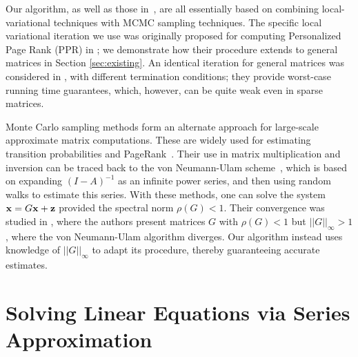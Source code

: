 Our algorithm, as well as those in~\cite{Lofgren2014,lofgren2016personalized,banerjee2015fast}, are all essentially based on combining local-variational techniques with MCMC sampling techniques.
The specific local variational iteration we use was originally proposed for computing Personalized Page Rank (PPR) in \cite{andersen2007local}; we demonstrate how their procedure extends to general matrices in Section \ref{sec:existing}. 
An identical iteration for general matrices was considered in \cite{lee2014asynchronous}, with different termination conditions; they provide worst-case running time guarantees, which, however, can be quite weak even in sparse matrices. 


Monte Carlo sampling methods form an alternate approach for large-scale approximate matrix computations. 
These are widely used for estimating transition probabilities and PageRank~\cite{Avrachenkov2007}.
Their use in matrix multiplication and inversion can be traced back to the von Neumann-Ulam scheme~\cite{forsythe1950matrix}, which is based on expanding $(I-A)^{-1}$ as an infinite power series, and then using random walks to estimate this series. 
With these methods, one can solve the system $\mathbf{x} = G\mathbf{x} + \mathbf{z}$ provided the spectral norm $\rho(G) < 1$. 
Their convergence was studied in \cite{ji2013convergence}, where the authors present matrices $G$ with $\rho(G) < 1$ but  $||G||_\infty > 1$, where the von Neumann-Ulam algorithm diverges.  
Our algorithm instead uses knowledge of $||G||_{\infty}$ to adapt its procedure, thereby guaranteeing accurate estimates.




\section{Solving Linear Equations via Series Approximation}
\label{sec:linsolve}

